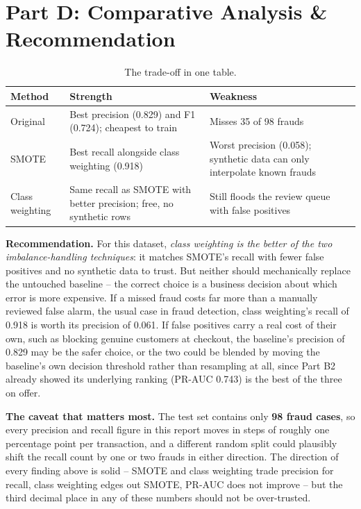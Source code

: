 \documentclass[11pt,a4paper]{article}
\begin{document}
\section*{Part D: Comparative Analysis \& Recommendation}

\begin{table}[H]
\centering
\begin{tabular}{lp{5.6cm}p{5.6cm}}
\toprule
\textbf{Method} & \textbf{Strength} & \textbf{Weakness} \\
\midrule
Original & Best precision (0.829) and F1 (0.724); cheapest to train & Misses 35 of 98 frauds \\
SMOTE & Best recall alongside class weighting (0.918) & Worst precision (0.058); synthetic data can only interpolate known frauds \\
Class weighting & Same recall as SMOTE with better precision; free, no synthetic rows & Still floods the review queue with false positives \\
\bottomrule
\end{tabular}
\caption{The trade-off in one table.}
\end{table}

\textbf{Recommendation.} For this dataset, \emph{class weighting is the better of the two
imbalance-handling techniques}: it matches SMOTE's recall with fewer false positives and
no synthetic data to trust. But neither should mechanically replace the untouched
baseline -- the correct choice is a business decision about which error is more
expensive. If a missed fraud costs far more than a manually reviewed false alarm, the
usual case in fraud detection, class weighting's recall of 0.918 is worth its precision
of 0.061. If false positives carry a real cost of their own, such as blocking genuine
customers at checkout, the baseline's precision of 0.829 may be the safer choice, or the
two could be blended by moving the baseline's own decision threshold rather than
resampling at all, since Part B2 already showed its underlying ranking (PR-AUC 0.743) is
the best of the three on offer.

\textbf{The caveat that matters most.} The test set contains only \textbf{98 fraud cases},
so every precision and recall figure in this report moves in steps of roughly one
percentage point per transaction, and a different random split could plausibly shift the
recall count by one or two frauds in either direction. The direction of every finding
above is solid -- SMOTE and class weighting trade precision for recall, class weighting
edges out SMOTE, PR-AUC does not improve -- but the third decimal place in any of these
numbers should not be over-trusted.
\end{document}
